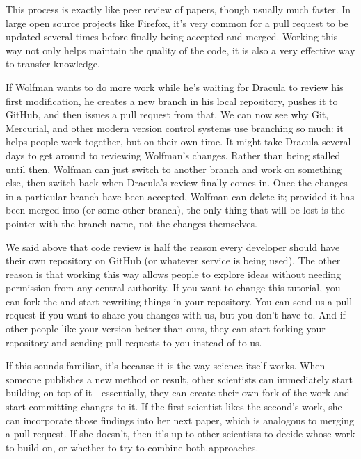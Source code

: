 This process is exactly like peer review of papers, though usually much
faster. In large open source projects like Firefox, it's very common for
a pull request to be updated several times before finally being accepted
and merged. Working this way not only helps maintain the quality of the
code, it is also a very effective way to transfer knowledge.

If Wolfman wants to do more work while he's waiting for Dracula to
review his first modification, he creates a new branch in his local
repository, pushes it to GitHub, and then issues a pull request from
that. We can now see why Git, Mercurial, and other modern version
control systems use branching so much: it helps people work together,
but on their own time. It might take Dracula several days to get around
to reviewing Wolfman's changes. Rather than being stalled until then,
Wolfman can just switch to another branch and work on something else,
then switch back when Dracula's review finally comes in. Once the
changes in a particular branch have been accepted, Wolfman can delete
it; provided it has been merged into  (or some other
branch), the only thing that will be lost is the pointer with the branch
name, not the changes themselves.

We said above that code review is half the reason every developer should
have their own repository on GitHub (or whatever service is being used).
The other reason is that working this way allows people to explore ideas
without needing permission from any central authority. If you want to
change this tutorial, you can fork the
 and start rewriting things in your repository. You can send
us a pull request if you want to share you changes with us, but you
don't have to. And if other people like your version better than ours,
they can start forking your repository and sending pull requests to you
instead of to us.

If this sounds familiar, it's because it is the way science itself
works. When someone publishes a new method or result, other scientists
can immediately start building on top of it---essentially, they can
create their own fork of the work and start committing changes to it. If
the first scientist likes the second's work, she can incorporate those
findings into her next paper, which is analogous to merging a pull
request. If she doesn't, then it's up to other scientists to decide
whose work to build on, or whether to try to combine both approaches.


